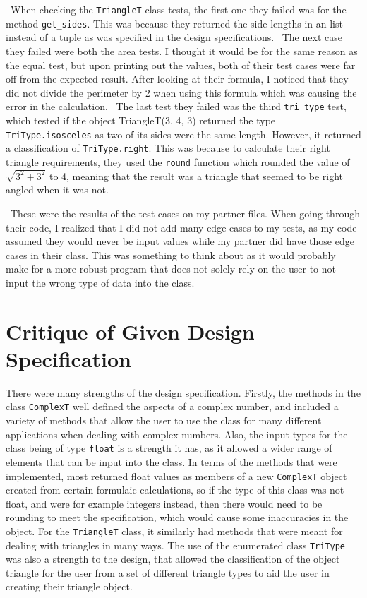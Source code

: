 \documentclass[12pt]{article}
\begin{document}
~\newline\noindent When checking the \verb|TriangleT| class tests, the first one 
they failed was for the method \verb|get_sides|. This was because they returned 
the side lengths in an list instead of a tuple as was specified in the design 
specifications.
~\newline\noindent The next case they failed were both the area tests. I thought 
it would be for the same reason as the equal test, but upon printing out the 
values, both of their test cases were far off from the expected result. After 
looking at their formula, I noticed that they did not divide the perimeter by 
2 when using this formula which was causing the error in the calculation. 
~\newline\noindent The last test they failed was the third \verb|tri_type| test, 
which tested if the object TriangleT(3, 4, 3) returned the type 
\verb|TriType.isosceles| as two of its sides were the same length. However, it 
returned a classification of \verb|TriType.right|. This was because to calculate 
their right triangle requirements, they used the \verb|round| function which 
rounded the value of $\sqrt{3^{2} + 3^{2}}$ to 4, meaning that the result was a triangle that seemed to be right angled when it was not. 

~\newline\noindent These were the results of the test cases on my partner files. 
When going through their code, I realized that I did not add many edge cases to 
my tests, as my code assumed they would never be input values while my partner 
did have those edge cases in their class. This was something to think about as 
it would probably make for a more robust program that does not solely rely on 
the user to not input the wrong type of data into the class. 

\section{Critique of Given Design Specification}

There were many strengths of the design specification. Firstly, the methods in 
the class \verb|ComplexT| well defined the aspects of a complex number, and 
included a variety of methods that allow the user to use the class for many 
different applications when dealing with complex numbers. Also, the input types 
for the class being of type \verb|float| is a strength it has, as it allowed a 
wider range of elements that can be input into the class. In terms of the methods 
that were implemented, most returned float values as members of a new 
\verb|ComplexT| object created from certain formulaic calculations, so if the 
type of this class was not float, and were for example integers instead, then 
there would need to be rounding to meet the specification, which would cause 
some inaccuracies in the object. For the \verb|TriangleT| class, it similarly 
had methods that were meant for dealing with triangles in many ways. The use of 
the enumerated class \verb|TriType| was also a strength to the design, that 
allowed the classification of the object triangle for the user from a set of 
different triangle types to aid the user in creating their triangle object. 
\end{document}
